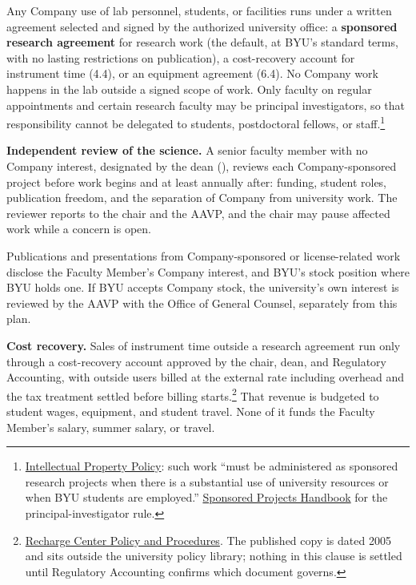 \documentclass[11pt]{article}
\begin{document}
 Any Company use of lab personnel, students, or facilities runs
under a written agreement selected and signed by the authorized university
office: a \textbf{sponsored research agreement} for research work (the
default, at BYU's standard terms, with no lasting restrictions on
publication), a cost-recovery account for instrument time (4.4), or an
equipment agreement (6.4). No Company work happens in the lab outside a signed
scope of work. Only faculty on regular appointments and certain research
faculty may be principal investigators, so that responsibility cannot be
delegated to students, postdoctoral fellows, or staff.\footnote{\href{https://policy.byu.edu/view/intellectual-property-policy}{Intellectual
Property Policy}: such work ``must be administered as sponsored research
projects when there is a substantial use of university resources or when BYU
students are employed.''
\href{https://finserve.byu.edu/00000193-6566-d995-a9db-eff6a47a0001/sponsored-programs-handbook}{Sponsored
Projects Handbook} for the principal-investigator rule.}

 \textbf{Independent review of the science.} A senior faculty
member with no Company interest, designated by the dean (\ph), reviews each
Company-sponsored project before work begins and at least annually after:
funding, student roles, publication freedom, and the separation of Company
from university work. The reviewer reports to the chair and the AAVP, and the
chair may pause affected work while a concern is open.

 Publications and presentations from Company-sponsored or
license-related work disclose the Faculty Member's Company interest, and BYU's
stock position where BYU holds one. If BYU accepts Company stock, the
university's own interest is reviewed by the AAVP with the Office of General
Counsel, separately from this plan.

 \textbf{Cost recovery.} Sales of instrument time outside a
research agreement run only through a cost-recovery account approved by the
chair, dean, and Regulatory Accounting, with outside users billed at the
external rate including overhead and the tax treatment settled before billing
starts.\footnote{\href{https://spo.byu.edu/00000190-3687-d777-a591-37af392d0001/rechargecenterpolicyprocedures-pdf}{Recharge
Center Policy and Procedures}. The published copy is dated 2005 and sits
outside the university policy library; nothing in this clause is settled until
Regulatory Accounting confirms which document governs.} That revenue is
budgeted to student wages, equipment, and student travel. None of it funds the
Faculty Member's salary, summer salary, or travel.
\end{document}
